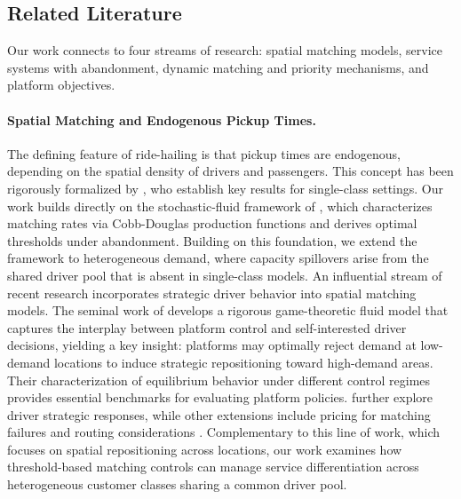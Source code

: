 
\subsection{Related Literature}

Our work connects to four streams of research: spatial matching models, service systems with abandonment, dynamic matching and priority mechanisms, and platform objectives.

\paragraph{Spatial Matching and Endogenous Pickup Times.}
The defining feature of ride-hailing is that pickup times are endogenous, depending on the spatial density of drivers and passengers.
This concept has been rigorously formalized by \citet{BesbesCastroLobel2021, BesbesCastroLobel2022}, who establish key results for single-class settings.
Our work builds directly on the stochastic-fluid framework of \citet{WangZhangHu2024}, which characterizes matching rates via Cobb-Douglas production functions and derives optimal thresholds under abandonment.
Building on this foundation, we extend the framework to heterogeneous demand, where capacity spillovers arise from the shared driver pool that is absent in single-class models.
An influential stream of recent research incorporates strategic driver behavior into spatial matching models.
The seminal work of \citet{doi:10.1287/msom.2023.1221} develops a rigorous game-theoretic fluid model that captures the interplay between platform control and self-interested driver decisions, yielding a key insight: platforms may optimally reject demand at low-demand locations to induce strategic repositioning toward high-demand areas.
Their characterization of equilibrium behavior under different control regimes provides essential benchmarks for evaluating platform policies.
\citet{GargNazerzadeh2022} further explore driver strategic responses, while other extensions include pricing for matching failures \citep{Castillo2025, CastilloKnoepfleWeyl2017} and routing considerations \citep{BravermanDaiLiuYing2019}.
Complementary to this line of work, which focuses on spatial repositioning across locations, our work examines how threshold-based matching controls can manage service differentiation across heterogeneous customer classes sharing a common driver pool.

